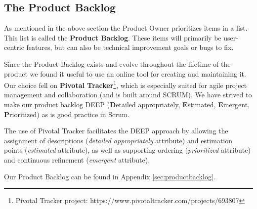\subsection{The Product Backlog}

As mentioned in the above section the Product Owner prioritizes items in a list. This list is called the \textbf{Product Backlog}. These items will primarily be user-centric features, but can also be technical improvement goals or bugs to fix.

Since the Product Backlog exists and evolve throughout the lifetime of the product we found it useful to use an online tool for creating and maintaining it. Our choice fell on \textbf{Pivotal Tracker}\footnote{Pivotal Tracker project: https://www.pivotaltracker.com/projects/693807}, which is especially suited for agile project management and collaboration (and is built around SCRUM). We have strived to make our product backlog DEEP (\textbf{D}etailed appropriately, \textbf{E}stimated, \textbf{E}mergent, \textbf{P}rioritized) as is good practice in Scrum.

The use of Pivotal Tracker facilitates the DEEP approach by allowing the assignment of descriptions (\textit{detailed appropriately} attribute) and  estimation points (\textit{estimated} attribute), as well as supporting  ordering (\textit{prioritized} attribute) and continuous refinement (\textit{emergent} attribute).

Our Product Backlog can be found in Appendix \ref{sec:productbacklog}.
